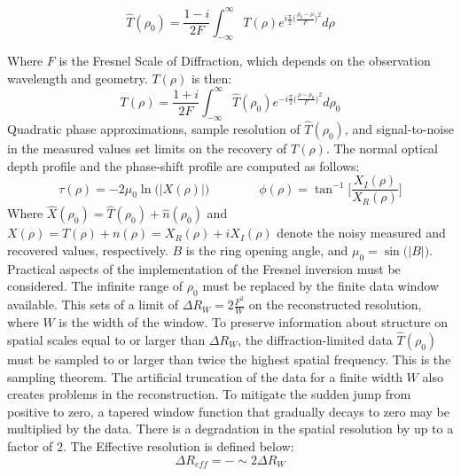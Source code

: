 \documentclass[oneside]{book}
\theoremstyle{mystyle}
\begin{document}
\begin{equation*}
    \hat{T}(\rho_0) = \frac{1-i}{2F}\int_{-\infty}^{\infty} T(\rho)e^{i\frac{\pi}{2}\big(\frac{\rho_0-\rho}{F}\big)^2}d\rho
\end{equation*}

\noindent Where $F$ is the Fresnel Scale of Diffraction, which depends on the observation wavelength and geometry. $T(\rho)$ is then:
\begin{equation}
T(\rho) = \frac{1+i}{2F}\int_{-\infty}^{\infty}\hat{T}(\rho_0)e^{-i\frac{\pi}{2}\big(\frac{\rho-\rho_0}{F}\big)^2}d\rho_{0}
\end{equation}
Quadratic phase approximations, sample resolution of $\hat{T}(\rho_0)$, and signal-to-noise in the measured values set limits on the recovery of $T(\rho)$. The normal optical depth profile and the phase-shift profile are computed as follows:
\begin{equation*}
    \tau(\rho) = -2\mu_{0}\ln\big(|X(\rho)|\big) \quad\quad\quad\quad \phi(\rho) = \tan^{-1}\bigg[\frac{X_{I}(\rho)}{X_{R}(\rho)}\bigg]
\end{equation*}
Where $\hat{X}(\rho_0) = \hat{T}(\rho_0) + \hat{n}(\rho_0)$ and $X(\rho) = T(\rho)+n(\rho) = X_{R}(\rho)+iX_{I}(\rho)$ denote the noisy measured and recovered values, respectively. $B$ is the ring opening angle, and $\mu_0 = \sin\big(|B|\big)$. Practical aspects of the implementation of the Fresnel inversion must be considered. The infinite range of $\rho_0$ must be replaced by the finite data window available. This sets of a limit of $\Delta R_{W} = 2\frac{F^2}{W}$ on the reconstructed resolution, where $W$ is the width of the window. To preserve information about structure on spatial scales equal to or larger than $\Delta R_{W}$, the diffraction-limited data $\hat{T}(\rho_0)$ must be sampled to or larger than twice the highest spatial frequency. This is the sampling theorem. The artificial truncation of the data for a finite width $W$ also creates problems in the reconstruction. To mitigate the sudden jump from positive to zero, a tapered window function that gradually decays to zero may be multiplied by the data. There is a degradation in the spatial resolution by up to a factor of $2$. The Effective resolution is defined below:
\begin{equation}
\Delta R_{eff} = -\sim 2\Delta R_{W}
\end{equation}
\end{document}
